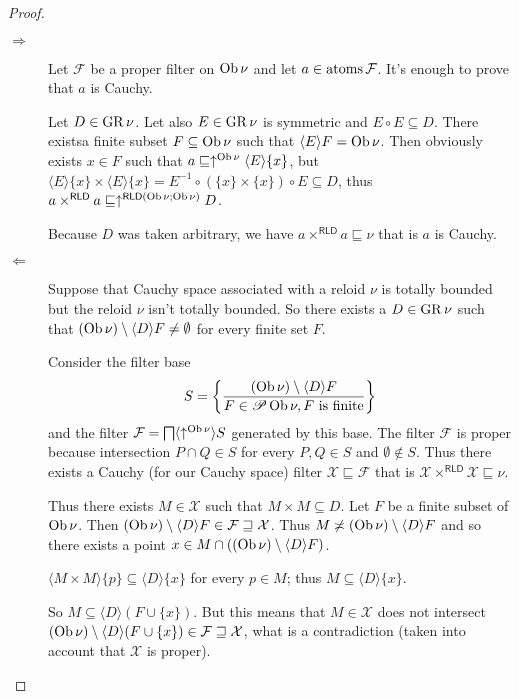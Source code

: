 \begin{proof}~
  
  \begin{description}
    \item[$\Rightarrow$] Let $\mathcal{F}$ be a proper filter on $\operatorname{Ob}
    \nu$ and let $a \in \operatorname{atoms} \mathcal{F}$. It's enough to prove that
    $a$ is Cauchy.
    
    Let $D \in \operatorname{GR} \nu$. Let also $E \in \operatorname{GR} \nu$ is symmetric
    and $E \circ E \subseteq D$. There existsa finite subset $F \subseteq
    \operatorname{Ob} \nu$ such that $\langle E \rangle F = \operatorname{Ob} \nu$. Then
    obviously exists $x \in F$ such that $a \sqsubseteq \uparrow^{\operatorname{Ob}
    \nu} \langle E \rangle \{ x \}$, but $\langle E \rangle \{ x \} \times
    \langle E \rangle \{ x \} = E^{- 1} \circ (\{ x \} \times \{ x \}) \circ E
    \subseteq D$, thus $a \times^{\mathsf{RLD}} a \sqsubseteq
    \uparrow^{\mathsf{RLD} (\operatorname{Ob} \nu ; \operatorname{Ob} \nu)} D$.
    
    Because $D$ was taken arbitrary, we have $a \times^{\mathsf{RLD}} a
    \sqsubseteq \nu$ that is $a$ is Cauchy.
    
    \item[$\Leftarrow$] Suppose that Cauchy space associated with a reloid
    $\nu$ is totally bounded but the reloid $\nu$ isn't totally bounded. So
    there exists a $D \in \operatorname{GR} \nu$ such that $(\operatorname{Ob} \nu) \setminus
    \langle D \rangle F \neq \emptyset$ for every finite set $F$.
    
    Consider the filter base
    \[ S = \left\{ \frac{ (\operatorname{Ob} \nu) \setminus \langle D \rangle F}{F \in \mathscr{P} \operatorname{Ob} \nu, F \text{ is finite}
       }\right\} \]
    and the filter $\mathcal{F} = \bigsqcap \langle \uparrow^{\operatorname{Ob} \nu}
    \rangle S$ generated by this base. The filter $\mathcal{F}$ is proper
    because intersection $P \cap Q \in S$ for every $P, Q \in S$ and
    $\emptyset \notin S$. Thus there exists a Cauchy (for our Cauchy space)
    filter $\mathcal{X} \sqsubseteq \mathcal{F}$ that is $\mathcal{X}
    \times^{\mathsf{RLD}} \mathcal{X} \sqsubseteq \nu$.
    
    Thus there exists $M \in \mathcal{X}$ such that $M \times M \subseteq D$.
    Let $F$ be a finite subset of $\operatorname{Ob} \nu$. Then $(\operatorname{Ob} \nu)
    \setminus \langle D \rangle F \in \mathcal{F} \sqsupseteq \mathcal{X}$.
    Thus $M \not\asymp (\operatorname{Ob} \nu) \setminus \langle D \rangle F$ and so
    there exists a point $x \in M \cap ((\operatorname{Ob} \nu) \setminus \langle D
    \rangle F)$.
    
    $\langle M \times M \rangle \{ p \} \subseteq \langle D \rangle \{ x \}$
    for every $p \in M$; thus $M \subseteq \langle D \rangle \{ x \}$.
    
    So $M \subseteq \langle D \rangle (F \cup \{ x \})$. But this means that
    $M \in \mathcal{X}$ does not intersect $(\operatorname{Ob} \nu) \setminus \langle
    D \rangle (F \cup \{ x \}) \in \mathcal{F} \sqsupseteq \mathcal{X}$, what
    is a contradiction (taken into account that $\mathcal{X}$ is proper).
  \end{description}
\end{proof}

